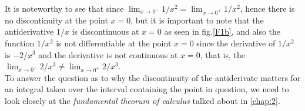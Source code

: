It is noteworthy to see that since $\lim_{x \to 0^-}1/x^2 = \lim_{x \to 0^+}1/x^2$, hence there is no discontinuity at the point $x = 0$, but it is important to note that the antiderivative $1/x$ is discontinuous at $x=0$ as seen in fig.\ref{F1b}, and also the function $1/x^2$ is not differentiable at the point $x=0$ since the derivative of $1/x^2$ is $-2/x^3$ and the derivative is not continuous at $x=0$, that is, the $\lim_{x \to 0^-} 2/x^3 \neq \lim_{x \to 0^+}2/x^3$.\\

To answer the question as to why the discontinuity of the antiderivate matters for an integral taken over the interval containing the point in question, we need to look closely at the \textit{fundamental theorum of calculus} talked about in \autoref{chap:2}.